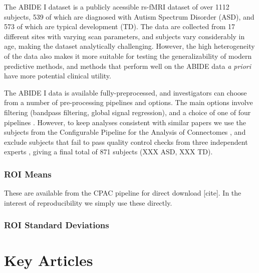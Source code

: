 \documentclass[10pt]{article}
\begin{document}
The ABIDE I dataset \citep{dimartinoAutismBrainImaging2014} is a publicly acessible rs-fMRI dataset of over
1112 subjects, 539 of which are diagnosed with Autism Spectrum Disorder (ASD),
and 573 of which are typical development (TD). The data are collected from 17 different sites with
varying scan parameters, and subjects vary considerably in age, making the dataset analytically
challenging. However, the high heterogeneity of the data also makes it more suitable for testing the
generalizability of modern predictive methods, and methods that perform well on the ABIDE data
\emph{a priori} have more potential clinical utility.

The ABIDE I data is available fully-preprocessed, and investigators can choose from a number of
pre-processing pipelines and options. The main options involve filtering (bandpass filtering, global
signal regression), and a choice of one of four pipelines \citep{dimartinoAutismBrainImaging2014}.
However, to keep analyses consistent with similar papers
\citet{abrahamDerivingReproducibleBiomarkers2017, mostafaDiagnosisAutismSpectrum2019,
yinDiagnosisAutismSpectrum2021, heinsfeldIdentificationAutismSpectrum2018} we use the subjects from
the Configurable Pipeline for the Analysis of Connectomes
\citep[CPAC;][]{cameronAutomatedAnalysisConnectomes2013}, and exclude subjects that fail to pass quality
control checks from three independent experts \citep[see][for
details]{abrahamDerivingReproducibleBiomarkers2017}, giving a final total of 871 subjects (XXX ASD,
XXX TD).



\subsubsection{ROI Means}

These are available from the CPAC pipeline for direct download [cite]. In the interest of reproducibility we simply
use these directly.

\subsubsection{ROI Standard Deviations}






\newpage

\section{Key Articles} \label{key-articles}
\end{document}
